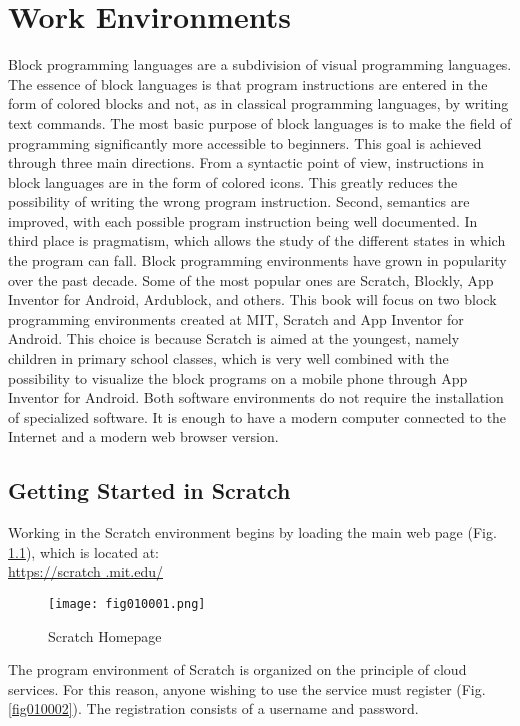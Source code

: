 \chapter{Work Environments}

Block programming languages are a subdivision of visual programming languages. The essence of block languages is that program instructions are entered in the form of colored blocks and not, as in classical programming languages, by writing text commands. The most basic purpose of block languages is to make the field of programming significantly more accessible to beginners. This goal is achieved through three main directions. From a syntactic point of view, instructions in block languages are in the form of colored icons. This greatly reduces the possibility of writing the wrong program instruction. Second, semantics are improved, with each possible program instruction being well documented. In third place is pragmatism, which allows the study of the different states in which the program can fall. Block programming environments have grown in popularity over the past decade. Some of the most popular ones are Scratch, Blockly, App Inventor for Android, Ardublock, and others. This book will focus on two block programming environments created at MIT, Scratch and App Inventor for Android. This choice is because Scratch is aimed at the youngest, namely children in primary school classes, which is very well combined with the possibility to visualize the block programs on a mobile phone through App Inventor for Android. Both software environments do not require the installation of specialized software. It is enough to have a modern computer connected to the Internet and a modern web browser version.

\section{Getting Started in Scratch}

Working in the Scratch environment begins by loading the main web page (Fig. \ref{fig010001}), which is located at: \\ \href{https://scratch.mit.edu/}{https://scratch .mit.edu/}

\begin{figure}[H]
   \centering
   \texttt{[image: fig010001.png]}
   \caption{Scratch Homepage}
\label{fig010001}
\end{figure}

The program environment of Scratch is organized on the principle of cloud services. For this reason, anyone wishing to use the service must register (Fig. \ref{fig010002}). The registration consists of a username and password.

